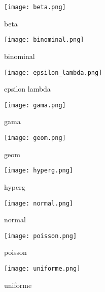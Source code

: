 \begin{figure}[h]\centering
\texttt{[image: beta.png]}
\caption{beta}
\end{figure}
\begin{figure}[h]\centering
    \texttt{[image: binominal.png]}
    \caption{binominal}
\end{figure}
\begin{figure}[h]\centering
    \texttt{[image: epsilon\_lambda.png]}
    \caption{epsilon lambda}
\end{figure}
\begin{figure}[h]\centering
    \texttt{[image: gama.png]}
    \caption{gama}
\end{figure}
\begin{figure}[h]\centering
    \texttt{[image: geom.png]}
    \caption{geom}
\end{figure}
\begin{figure}[h]\centering
    \texttt{[image: hyperg.png]}
    \caption{hyperg}
\end{figure}
\begin{figure}[h]\centering
    \texttt{[image: normal.png]}
    \caption{normal}
\end{figure}
\begin{figure}[h]\centering
    \texttt{[image: poisson.png]}
    \caption{poisson}
\end{figure}

\begin{figure}[h]\centering
    \texttt{[image: uniforme.png]}
    \caption{uniforme}
\end{figure}
